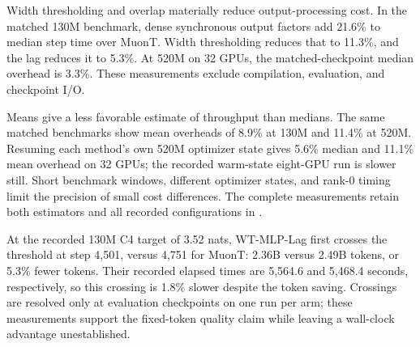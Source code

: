 Width thresholding and overlap materially reduce output-processing cost. In the matched 130M benchmark, dense synchronous output factors add 21.6\% to median step time over MuonT. Width thresholding reduces that to 11.3\%, and the lag reduces it to 5.3\%. At 520M on 32 GPUs, the matched-checkpoint median overhead is 3.3\%. These measurements exclude compilation, evaluation, and checkpoint I/O.



Means give a less favorable estimate of throughput than medians. The same matched benchmarks show mean overheads of 8.9\% at 130M and 11.4\% at 520M. Resuming each method's own 520M optimizer state gives 5.6\% median and 11.1\% mean overhead on 32 GPUs; the recorded warm-state eight-GPU run is slower still. Short benchmark windows, different optimizer states, and rank-0 timing limit the precision of small cost differences. The complete measurements retain both estimators and all recorded configurations in .

At the recorded 130M C4 target of 3.52 nats, WT-MLP-Lag first crosses the threshold at step 4,501, versus 4,751 for MuonT: 2.36B versus 2.49B tokens, or 5.3\% fewer tokens. Their recorded elapsed times are 5,564.6 and 5,468.4 seconds, respectively, so this crossing is 1.8\% slower despite the token saving. Crossings are resolved only at evaluation checkpoints on one run per arm; these measurements support the fixed-token quality claim while leaving a wall-clock advantage unestablished.
